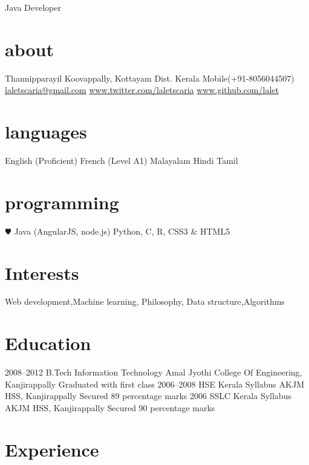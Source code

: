 \documentclass[]{lalet-cv}
\begin{document}
       {Java Developer}


\begin{aside}
  \section{about}
    Thannipparayil
    Koovappally,
    Kottayam Dist.
    Kerala
    Mobile(+91-8056044507)
    ~
    \href{mailto:laletscaria@gmail.com}{laletscaria@gmail.com}			
    \href{http://www.twitter.com/laletscaria}{www.twitter.com/laletscaria}
    \href{http://www.github.com/lalet}{www.github.com/lalet}
  \section{languages}
    English (Proficient)
    French (Level A1)
    Malayalam
    Hindi
    Tamil
  \section{programming}
    {\color{red} $\varheartsuit$} Java
    (AngularJS, node.js)
    Python, C, R,
    CSS3 \& HTML5
\end{aside}

\section{Interests}

Web development,Machine learning, Philosophy,
Data structure,Algorithms

\section{Education}

\begin{entrylist}
  \entry
    {2008–2012}
    {B.Tech Information Technology}
    {Amal Jyothi College Of Engineering, Kanjirappally}
    {Graduated with first class}
  \entry
    {2006–2008}
    {HSE Kerala Syllabus}
    {AKJM HSS, Kanjirappally}
    {Secured 89 percentage marks}
  \entry
    {2006}
    {SSLC Kerala Syllabus}
    {AKJM HSS, Kanjirappally}
    {Secured 90 percentage marks}
\end{entrylist}

\section{Experience}
\end{document}
